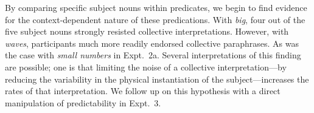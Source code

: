 \documentclass[preprint,12pt,authoryear,titlepage]{elsarticle}
\begin{document}


By comparing specific subject nouns within predicates, we begin to find evidence for the context-dependent nature of these predications. With \emph{big}, four out of the five subject nouns strongly resisted collective interpretations. However, with \emph{waves}, participants much more readily endorsed collective paraphrases. As was the case with \emph{small numbers} in Expt.~2a. Several interpretations of this finding are possible; one is that limiting the noise of a collective interpretation---by reducing the variability in the physical instantiation of the subject---increases the rates of that interpretation. We follow up on this hypothesis with a direct manipulation of predictability in Expt.~3.
\end{document}
